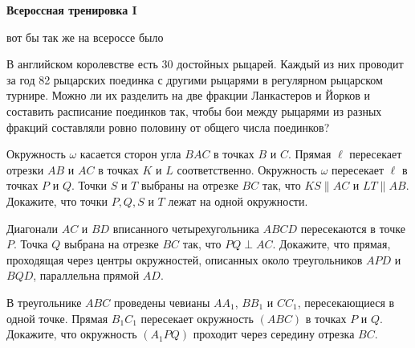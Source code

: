 \centerline{\bf \Huge Всероссная тренировка I}
\centerline{\bf \Huge }

\begin{flushright}
        \scriptsize{вот бы так же на всероссе было}
\end{flushright}

В английском королевстве есть 30 достойных рыцарей. Каждый из них проводит за год 82 рыцарских поединка с другими рыцарями в регулярном рыцарском турнире. Можно ли их разделить на две фракции Ланкастеров и Йорков и составить расписание поединков так, чтобы бои между рыцарями из разных фракций составляли ровно половину от общего числа поединков?


Окружность $\omega$ касается сторон угла $B A C$ в точках $B$ и $C$. Прямая $\ell$ пересекает отрезки $A B$ и $A C$ в точках $K$ и $L$ соответственно. Окружность $\omega$ пересекает $\ell$ в точках $P$ и $Q$. Точки $S$ и $T$ выбраны на отрезке $B C$ так, что $K S \| A C$ и $L T \| A B$. Докажите, что точки $P, Q, S$ и $T$ лежат на одной окружности.


Диагонали $A C$ и $B D$ вписанного четырехугольника $A B C D$ пересекаются в точке $P$. Точка $Q$ выбрана на отрезке $B C$ так, что $P Q \perp A C$. Докажите, что прямая, проходящая через центры окружностей, описанных около треугольников $A P D$ и $B Q D$, параллельна прямой $A D$.

В треугольнике $ABC$ проведены чевианы $AA_1$, $BB_1$ и $CC_1$, пересекающиеся в одной точке. Прямая $B_1C_1$ пересекает окружность $(ABC)$ в точках $P$ и $Q$. Докажите, что окружность $(A_1PQ)$ проходит через середину отрезка $BC$.